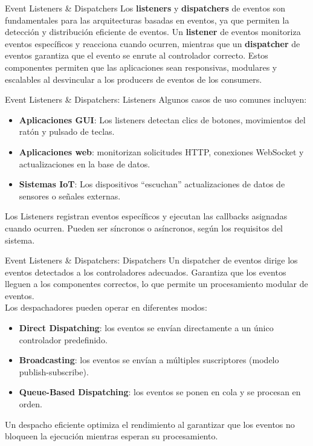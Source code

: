 \documentclass[11pt]{beamer}
\begin{document}
	\begin{frame}{Event Listeners \& Dispatchers}
	\justifying
	Los \textbf{listeners} y \textbf{dispatchers} de eventos son fundamentales para las arquitecturas basadas en eventos, ya que permiten la detección y distribución eficiente de eventos. Un \textbf{listener} de eventos monitoriza eventos específicos y reacciona cuando ocurren, mientras que un \textbf{dispatcher} de eventos garantiza que el evento se enrute al controlador correcto. Estos componentes permiten que las aplicaciones sean responsivas, modulares y escalables al desvincular a los producers de eventos de los consumers.
	\end{frame}
	
	\begin{frame}{Event Listeners \& Dispatchers: Listeners}
	\small
	Algunos casos de uso comunes incluyen:
	\begin{itemize}
		\item \textbf{Aplicaciones GUI}: Los listeners detectan clics de botones, movimientos del ratón y pulsado de teclas.
		\item \textbf{Aplicaciones web}: monitorizan solicitudes HTTP, conexiones WebSocket y actualizaciones en la base de datos.
		\item \textbf{Sistemas IoT}: Los dispositivos ``escuchan'' actualizaciones de datos de sensores o señales externas.
	\end{itemize} 
	\vspace{1cm}
	Los Listeners registran eventos específicos y ejecutan las callbacks asignadas cuando ocurren. Pueden ser síncronos o asíncronos, según los requisitos del sistema.
	\end{frame}
	
	\begin{frame}{Event Listeners \& Dispatchers: Dispatchers}
	\small
	Un dispatcher de eventos dirige los eventos detectados a los controladores adecuados. Garantiza que los eventos lleguen a los componentes correctos, lo que permite un procesamiento modular de eventos. \\
	\vspace{0.5cm}
	Los despachadores pueden operar en diferentes modos:
	\vspace{0.3cm}
	\begin{itemize}
		\item \textbf{Direct Dispatching}: los eventos se envían directamente a un único controlador predefinido.
		\item \textbf{Broadcasting}: los eventos se envían a múltiples suscriptores (modelo publish-subscribe).
		\item \textbf{Queue-Based Dispatching}: los eventos se ponen en cola y se procesan en orden.
	\end{itemize} 
	\vspace{0.5cm}
	Un despacho eficiente optimiza el rendimiento al garantizar que los eventos no bloqueen la ejecución mientras esperan su procesamiento.

	\end{frame}
\end{document}
